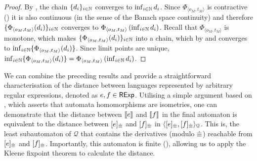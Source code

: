 \begin{proof}
 By , the chain $\{d_i\}_{i \in \mathbb{N}}$ converges to $\inf_{i \in \mathbb{N}} d_i$. Since $\Phi_{\langle o_M, t_M\rangle}$ is contractive () it is also continuous (in the sense of the Banach space continuity) and therefore $\{\Phi_{\langle o_M, t_M\rangle}(d_i)\}_{i \in \mathbb{N}}$ converges to $\Phi_{\langle o_M, t_M\rangle} \left(\inf_{i \in \mathbb{N}} d_i\right)$. Recall that $\Phi_{\langle o_M, t_M\rangle}$ is monotone, which makes $\{\Phi_{\langle o_M, t_M\rangle}(d_i)\}_{i \in \mathbb{N}}$ into a chain, which by  and  converges to $\inf_{i \in \mathbb{N}} \{\Phi_{\langle o_M, t_M\rangle} (d_i)\}$. Since limit points are unique, $\inf_{i \in \mathbb{N}} \{\Phi_{\langle o_M, t_M\rangle} (d_i)\} = \Phi_{\langle o_M, t_M\rangle} \left(\inf_{i \in \mathbb{N}} d_i\right)$.
\end{proof}
We can combine the preceding results and provide a straightforward characterisation of the distance between languages represented by arbitrary regular expressions, denoted as $e, f \in \mathsf{RExp}$. Utilising a simple argument based on , which asserts that automata homomorphisms are isometries, one can demonstrate that the distance between $\left\llbracket{e}\right\rrbracket$ and $\left\llbracket{f}\right\rrbracket$ in the final automaton is equivalent to the distance between $[e]_{{\mathrel{\dot\equiv}}}$ and $[f]_{{\mathrel{\dot\equiv}}}$ in $\langle [e]_{{\mathrel{\dot\equiv}}},[f]_{{\mathrel{\dot\equiv}}} \rangle_{\mathcal{Q}}$. This is, the least subautomaton of $\mathcal{Q}$ that contains the derivatives (modulo ${\mathrel{\dot\equiv}}$) reachable from $[e]_{{\mathrel{\dot\equiv}}}$ and $[f]_{{\mathrel{\dot\equiv}}}$. Importantly, this automaton is finite (), allowing us to apply the Kleene fixpoint theorem to calculate the distance.

